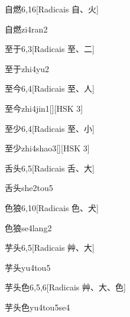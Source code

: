\begin{entry}{自燃}{6,16}[Radicais ⾃、⽕]
  \begin{phonetics}{自燃}{zi4ran2}
  \end{phonetics}
\end{entry}

\begin{entry}{至于}{6,3}[Radicais ⾄、⼆]
  \begin{phonetics}{至于}{zhi4yu2}
  \end{phonetics}
\end{entry}

\begin{entry}{至今}{6,4}[Radicais ⾄、⼈]
  \begin{phonetics}{至今}{zhi4jin1}[][HSK 3]
  \end{phonetics}
\end{entry}

\begin{entry}{至少}{6,4}[Radicais ⾄、⼩]
  \begin{phonetics}{至少}{zhi4shao3}[][HSK 3]
  \end{phonetics}
\end{entry}

\begin{entry}{舌头}{6,5}[Radicais ⾆、⼤]
  \begin{phonetics}{舌头}{she2tou5}
  \end{phonetics}
\end{entry}

\begin{entry}{色狼}{6,10}[Radicais ⾊、⽝]
  \begin{phonetics}{色狼}{se4lang2}
  \end{phonetics}
\end{entry}

\begin{entry}{芋头}{6,5}[Radicais ⾋、⼤]
  \begin{phonetics}{芋头}{yu4tou5}
  \end{phonetics}
\end{entry}

\begin{entry}{芋头色}{6,5,6}[Radicais ⾋、⼤、⾊]
  \begin{phonetics}{芋头色}{yu4tou5se4}
  \end{phonetics}
\end{entry}

